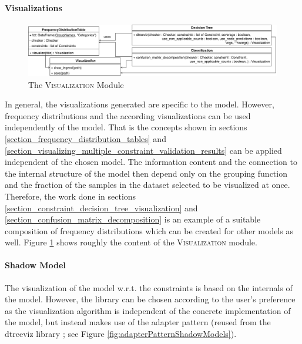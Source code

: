 \paragraph{Visualizations}
\begin{figure}
    \centering
    \includegraphics[width=\textwidth]{images/implementation/Visualization.png}
    \caption{The \textsc{Visualization} Module}
    \label{fig:the_visualization_module}
\end{figure}
In general, the visualizations generated are specific to the model. However, frequency distributions and the according visualizations can be used independently of the model. That is the concepts shown in sections \ref{section_frequency_distribution_tables} and \ref{section_visualizing_multiple_constraint_validation_results} can be applied independent of the chosen model. The information content and the connection to the internal structure of the model then depend only on the grouping function and the fraction of the samples in the dataset selected to be visualized at once. Therefore, the work done in sections \ref{section_constraint_decision_tree_visualization} and \ref{section_confusion_matrix_decomposition} is an example of a suitable composition of frequency distributions which can be created for other models as well. Figure \ref{fig:the_visualization_module} shows roughly the content of the \textsc{Visualization} module. 


\paragraph{Shadow Model}
The visualization of the model w.r.t. the constraints is based on the internals of the model. However, the library can be chosen according to the user's preference as the visualization algorithm is independent of the concrete implementation of the model, but instead makes use of the adapter pattern (reused from the dtreeviz library \cite{dtreeviz}; see Figure \ref{fig:adapterPatternShadowModels}).






